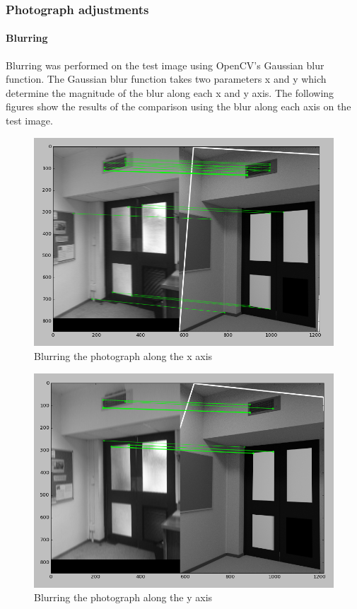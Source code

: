 \documentclass[11pt,a4paper]{report}
\begin{document}
			\subsubsection{Photograph adjustments}
				\paragraph{Blurring}
					Blurring was performed on the test image using OpenCV's Gaussian blur function. The Gaussian blur function takes two parameters x and y which determine the magnitude of the blur along each x and y axis. The following figures show the results of the comparison using the blur along each axis on the test image.
					\begin{figure}[H]
						\centering
						\includegraphics[width=1\textwidth]{x_blur}
						\caption{Blurring the photograph along the x axis}
						\label{fig:x_blur}
					\end{figure}
					
					\begin{figure}[H]
						\centering
						\includegraphics[width=1\textwidth]{y_blur}
						\caption{Blurring the photograph along the y axis}
						\label{fig:y_blur}
					\end{figure}
					
\end{document}
